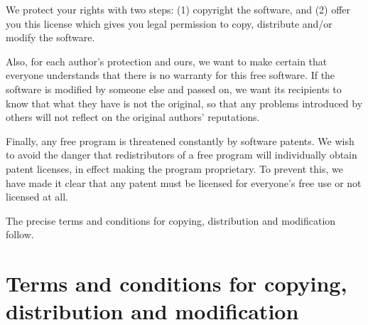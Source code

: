 \documentclass[a4paper]{report}
\begin{document}
We protect your rights with two steps: (1) copyright the software, and (2)
offer you this license which gives you legal permission to copy, distribute
and/or modify the software.

Also, for each author's protection and ours, we want to make certain that
everyone understands that there is no warranty for this free software.  If
the software is modified by someone else and passed on, we want its
recipients to know that what they have is not the original, so that any
problems introduced by others will not reflect on the original authors'
reputations.

Finally, any free program is threatened constantly by software patents.  We
wish to avoid the danger that redistributors of a free program will
individually obtain patent licenses, in effect making the program
proprietary.  To prevent this, we have made it clear that any patent must be
licensed for everyone's free use or not licensed at all.

The precise terms and conditions for copying, distribution and modification
follow.


\section*{Terms and conditions for copying, distribution and modification}
\end{document}
